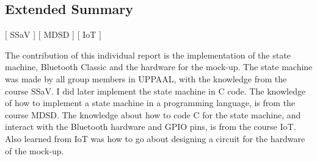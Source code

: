 \subsection*{Extended Summary}
[ SSaV ] [ MDSD ] [ IoT ] 
\newline

The contribution of this individual report is the implementation of the state machine, Bluetooth Classic and the hardware for the mock-up.
The state machine was made by all group members in UPPAAL, with the knowledge from the course SSaV.
I did later implement the state machine in C code.
The knowledge of how to implement a state machine in a programming language, is from the course MDSD.
The knowledge about how to code C for the state machine, and interact with the Bluetooth hardware and GPIO pins, is from the course IoT.
Also learned from IoT was how to go about designing a circuit for the hardware of the mock-up.